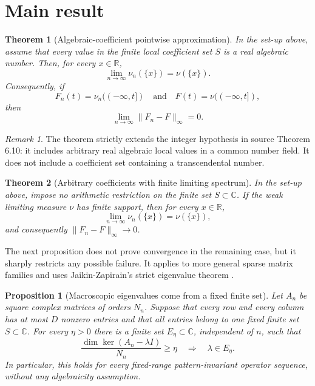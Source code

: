 \documentclass[11pt]{article}
\newtheorem{theorem}{Theorem}
\newtheorem{proposition}{Proposition}
\theoremstyle{definition}
\theoremstyle{remark}
\newtheorem{remark}{Remark}
\newcommand{\R}{\mathbb{R}}
\begin{document}
\section{Main result}

\begin{theorem}[Algebraic-coefficient pointwise approximation]
\label{thm:main}
In the set-up above, assume that every value in the finite local coefficient
set $S$ is a real algebraic number.  Then, for every $x\in\R$,
\[
             \lim_{n\to\infty}\nu_n(\{x\})=\nu(\{x\}).
\]
Consequently, if
\[
 F_n(t)=\nu_n((-\infty,t])\quad\text{and}\quad
 F(t)=\nu((-\infty,t]),
\]
then
\[
             \lim_{n\to\infty}\|F_n-F\|_\infty=0.
\]
\end{theorem}

\begin{remark}
The theorem strictly extends the integer hypothesis in source Theorem 6.10:
it includes arbitrary real algebraic local values in a common number field.
It does not include a coefficient set containing a transcendental number.
\end{remark}

\begin{theorem}[Arbitrary coefficients with finite limiting spectrum]
\label{thm:finite-spectrum}
In the set-up above, impose no arithmetic restriction on the finite set
$S\subset\mathbb C$.  If the weak limiting measure $\nu$ has finite support, then
for every $x\in\R$,
\[
             \lim_{n\to\infty}\nu_n(\{x\})=\nu(\{x\}),
\]
and consequently $\|F_n-F\|_\infty\to0$.
\end{theorem}

The next proposition does not prove convergence in the remaining case, but
it sharply restricts any possible failure.  It applies to more general sparse
matrix families and uses Jaikin-Zapirain's strict eigenvalue theorem
\cite[Theorem~2.2]{Jaikin}.

\begin{proposition}[Macroscopic eigenvalues come from a fixed finite set]
\label{prop:strict}
Let $A_n$ be square complex matrices of orders $N_n$.  Suppose that every row
and every column has at most $D$ nonzero entries and that all entries belong
to one fixed finite set $S\subset\mathbb C$.  For every $\eta>0$ there is a
finite set $E_\eta\subset\mathbb C$, independent of $n$, such that
\[
 \frac{\dim\ker(A_n-\lambda I)}{N_n}\ge\eta
 \quad\Longrightarrow\quad \lambda\in E_\eta.
\]
In particular, this holds for every fixed-range pattern-invariant operator
sequence, without any algebraicity assumption.
\end{proposition}
\end{document}
